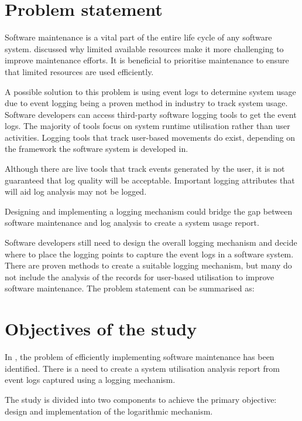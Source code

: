 \section{Problem statement}\label{sec:ch1_problemStatement}
Software maintenance is a vital part of the entire life cycle of any software system. discussed why limited available resources make it more challenging to improve maintenance efforts. It is beneficial to prioritise maintenance to ensure that limited resources are used efficiently. \par A possible solution to this problem is using event logs to determine system usage due to event logging being a proven method in industry to track system usage. Software developers can access third-party software logging tools to get the event logs. The majority of tools focus on system runtime utilisation rather than user activities. Logging tools that track user-based movements do exist, depending on the framework the software system is developed in. \par Although there are live tools that track events generated by the user, it is not guaranteed that log quality will be acceptable. Important logging attributes that will aid log analysis may not be logged. \par Designing and implementing a logging mechanism could bridge the gap between software maintenance and log analysis to create a system usage report. \par Software developers still need to design the overall logging mechanism and decide where to place the logging points to capture the event logs in a software system. There are proven methods to create a suitable logging mechanism, but many do not include the analysis of the records for user-based utilisation to improve software maintenance. The problem statement can be summarised as:

\begin{center}
	\begin{tcolorbox}[colback=lightgray, colframe=black, sharp corners=all, arc=4pt]
		\begin{minipage}{\textwidth}
			\RaggedRight\textit{\problemStatement}
		\end{minipage}
	\end{tcolorbox}
\end{center}

\section{Objectives of the study}\label{sec:ch1_objectives}
In , the problem of efficiently implementing software maintenance has been identified. There is a need to create a system utilisation analysis report from event logs captured using a logging mechanism. \par The study is divided into two components to achieve the primary objective: design and implementation of the logarithmic mechanism. 

